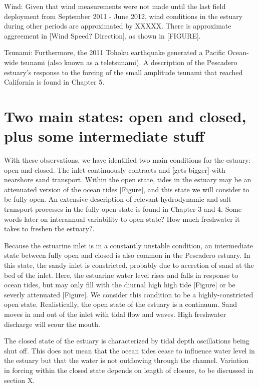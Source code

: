 Wind: 
Given that wind measurements were not made until the last field deployment from September 2011 - June 2012, wind conditions in the estuary during other periods are approximated by XXXXX. There is approximate aggreement in [Wind Speed? Direction], as shown in [FIGURE]. 

Tsunami:
Furthermore, the 2011 Tohoku earthquake generated a Pacific Ocean-wide tsunami (also known as a teletsunami). A description of the Pescadero estuary's response to the forcing of the small amplitude tsunami that reached California is found in Chapter 5. 


\section{Two main states: open and closed, plus some intermediate stuff}
\label{betterlabelmaybe}

With these observations, we have identified two main conditions for the estaury: open and closed.  The inlet continuously contracts and [gets bigger] with nearshore sand transport. Within the open state, tides in the estuary may be an attenuated version of the ocean tides [Figure], and this state we will consider to be fully open. An extensive description of relevant hydrodynamic and salt transport processes in the fully open state is found in Chapter 3 and 4. {Some words later on interannual variability to open state? How much freshwater it takes to freshen the estuary?}. 

Because the estuarine inlet is in a constantly unstable condition, an intermediate state between fully open and closed is also common in the Pescadero estuary.  In this state, the sandy inlet is constricted, probably due to accretion of sand at the bed of the inlet. Here, the estuarine water level rises and falls in response to ocean tides, but may only fill with the diurnal high high tide [Figure] or be severly attenuated [Figure]. We consider this condition to be a highly-constricted open state. Realistically, the open state of the estuary is a continuum. Sand moves in and out of the inlet with tidal flow and waves. High freshwater discharge will scour the mouth. 

The closed state of the estuary is characterized by tidal depth oscillations being shut off. This does not mean that the ocean tides cease to influence water level in the estuary but that the water is not outflowing through the channel. Variation in forcing within the closed state depends on length of closure, to be discussed in section {X}. 

